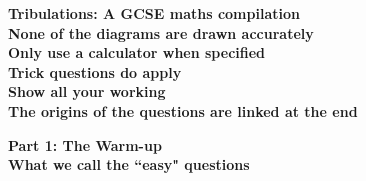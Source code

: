 \documentclass{exam}
\begin{document}
\pagestyle{empty}

\begin{titlepage}
    \begin{center}

        \vspace*{\fill}
        \textbf{Tribulations: A GCSE maths compilation}\\
        \vspace*{1cm}
        \vspace*{1cm}
        \textbf{None of the diagrams are drawn accurately}\\
        \vspace*{1cm}
        \vspace*{1cm}
        \textbf{Only use a calculator when specified}\\
        \vspace*{1cm}
        \vspace*{1cm}
        \textbf{Trick questions do apply}\\
        \vspace*{1cm}
        \vspace*{1cm}
        \textbf{Show all your working}\\
        \vspace*{1cm}
        \vspace*{1cm}
        \textbf{The origins of the questions are linked at the end}\\
        \vspace*{\fill}
            
    \end{center}
\end{titlepage}
\newpage
\begin{titlepage}
    \begin{center}

        \vspace*{\fill}
        \Large \textbf{Part 1: The Warm-up}\\
        \vspace*{1cm}
        \vspace*{1cm}
        \small \textbf{What we call the ``easy" questions}\\
        \vspace*{\fill}
        
    \end{center}
\end{titlepage}
\newpage
\end{document}
